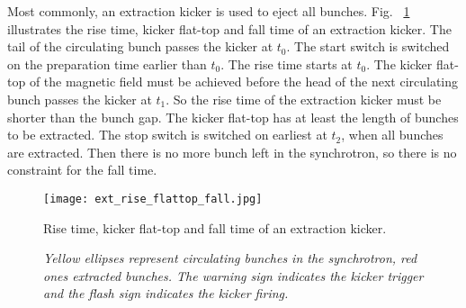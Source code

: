 %		  
%


Most commonly, an extraction kicker is used to eject all bunches. Fig. ~\ref{ext_rise_flattop_fall} illustrates the rise time, kicker flat-top and fall time of an extraction kicker. The tail of the circulating bunch passes the kicker at $t_0$. The start switch is switched on the preparation time earlier than $t_0$. The rise time starts at $t_0$. The kicker flat-top of the magnetic field must be achieved before the head of the next circulating bunch passes the kicker at $t_1$. So the rise time of the extraction kicker must be shorter than the bunch gap. The kicker flat-top has at least the length of bunches to be extracted. The stop switch is switched on earliest at $t_2$, when all bunches are extracted. Then there is no more bunch left in the synchrotron, so there is no constraint for the fall time. 

\begin{figure}[!htb]
   \centering   
   \texttt{[image: ext\_rise\_flattop\_fall.jpg]}
   \caption{Rise time, kicker flat-top and fall time of an extraction kicker.}
	\caption*{\textsl{\small{Yellow ellipses represent circulating bunches in the synchrotron, red ones extracted bunches. The warning sign indicates the kicker trigger and the flash sign indicates the kicker firing. }}}
   \label{ext_rise_flattop_fall}
\end{figure}

